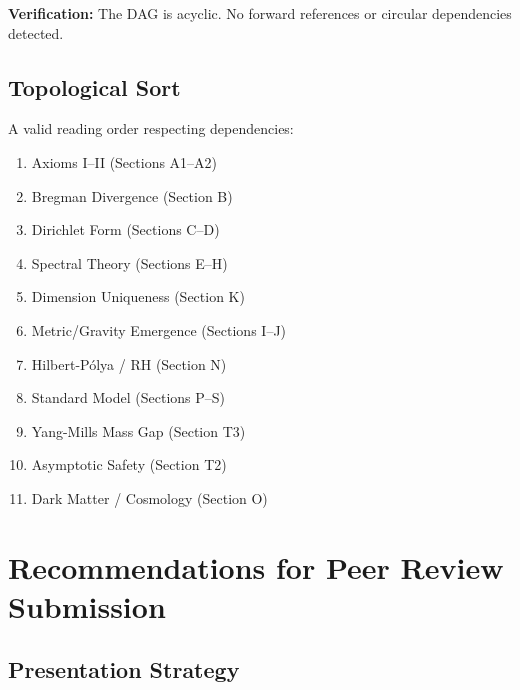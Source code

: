 \documentclass[12pt, a4paper]{article}
\theoremstyle{definition}
\theoremstyle{remark}
\begin{document}
\textbf{Verification:} The DAG is acyclic. No forward references or circular dependencies detected.

\subsection{Topological Sort}

A valid reading order respecting dependencies:
\begin{enumerate}
    \item Axioms I--II (Sections A1--A2)
    \item Bregman Divergence (Section B)
    \item Dirichlet Form (Sections C--D)
    \item Spectral Theory (Sections E--H)
    \item Dimension Uniqueness (Section K)
    \item Metric/Gravity Emergence (Sections I--J)
    \item Hilbert-P\'{o}lya / RH (Section N)
    \item Standard Model (Sections P--S)
    \item Yang-Mills Mass Gap (Section T3)
    \item Asymptotic Safety (Section T2)
    \item Dark Matter / Cosmology (Section O)
\end{enumerate}

\section{Recommendations for Peer Review Submission}

\subsection{Presentation Strategy}
\end{document}

